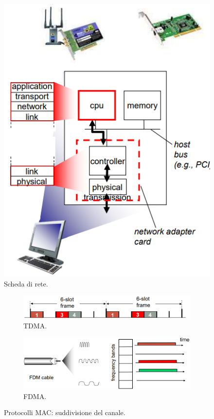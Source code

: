 \documentclass[11pt, italian, openany]{book}
\begin{document}
\begin{sloppypar}
\begin{figure}[!h]
	\centering
	\includegraphics[scale=0.5]{images/link-adaptor.png}
	\caption{Scheda di rete.}
	\label{fig:link-adaptor}
\end{figure}

\begin{figure}[!h]
	\begin{subfigure}[t]{0.44 \linewidth} \centering
		\includegraphics[scale=0.3]{images/link-tdma.png}
		\caption{TDMA.}
	\end{subfigure}
	\begin{subfigure}[t]{0.55 \linewidth} \centering
		\includegraphics[scale=0.25]{images/link-fdma.png}
		\caption{FDMA.}
	\end{subfigure}
	\caption{Protocolli MAC: suddivisione del canale.}
	\label{fig:link-suddivisione-canale}
\end{figure}


\end{sloppypar}
\end{document}
